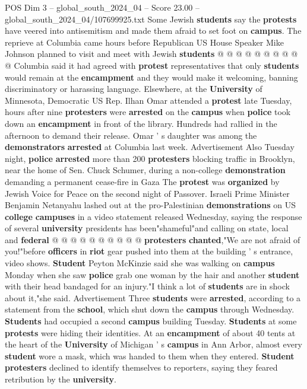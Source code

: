 \begin{textsample}{POS Dim 3 – global\_south\_2024\_04 – Score 23.00 – global\_south\_2024\_04/107699925.txt}
Some Jewish \textbf{students} say the \textbf{protests} have veered into antisemitism and made them afraid to set foot on \textbf{campus}.
The reprieve at Columbia came hours before Republican US House Speaker Mike Johnson planned to visit and meet with Jewish \textbf{students} @ @ @ @ @ @ @ @ @ @ Columbia said it had agreed with \textbf{protest} representatives that only \textbf{students} would remain at the \textbf{encampment} and they would make it welcoming, banning discriminatory or harassing language.
Elsewhere, at the \textbf{University} of Minnesota, Democratic US Rep.
Ilhan Omar attended a \textbf{protest} late Tuesday, hours after nine \textbf{protesters} were \textbf{arrested} on the \textbf{campus} when \textbf{police} took down an \textbf{encampment} in front of the library.
Hundreds had rallied in the afternoon to demand their release.
Omar ' s daughter was among the \textbf{demonstrators} \textbf{arrested} at Columbia last week.
Advertisement Also Tuesday night, \textbf{police} \textbf{arrested} more than 200 \textbf{protesters} blocking traffic in Brooklyn, near the home of Sen.
Chuck Schumer, during a non-college \textbf{demonstration} demanding a permanent cease-fire in Gaza The \textbf{protest} was \textbf{organized} by Jewish Voice for Peace on the second night of Passover.
Israeli Prime Minister Benjamin Netanyahu lashed out at the pro-Palestinian \textbf{demonstrations} on US \textbf{college} \textbf{campuses} in a video statement released Wednesday, saying the response of several \textbf{university} presidents has been"shameful"and calling on state, local and \textbf{federal} @ @ @ @ @ @ @ @ @ @ \textbf{protesters} \textbf{chanted},"We are not afraid of you!"before \textbf{officers} in \textbf{riot} gear pushed into them at the building ' s entrance, video shows. \textbf{Student} Peyton McKinzie said she was walking on \textbf{campus} Monday when she saw \textbf{police} grab one woman by the hair and another \textbf{student} with their head bandaged for an injury."I think a lot of \textbf{students} are in shock about it,"she said.
Advertisement Three \textbf{students} were \textbf{arrested}, according to a statement from the \textbf{school}, which shut down the \textbf{campus} through Wednesday. \textbf{Students} had occupied a second \textbf{campus} building Tuesday. \textbf{Students} at some \textbf{protests} were hiding their identities.
At an \textbf{encampment} of about 40 tents at the heart of the \textbf{University} of Michigan ' s \textbf{campus} in Ann Arbor, almost every \textbf{student} wore a mask, which was handed to them when they entered. \textbf{Student} \textbf{protesters} declined to identify themselves to reporters, saying they feared retribution by the \textbf{university}.

\end{textsample}
